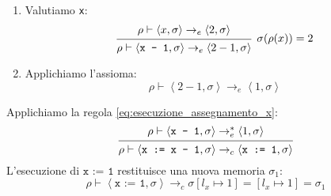 \documentclass[a4paper]{article}
\begin{document}
\begin{example}
\begin{itemize}
\begin{enumerate}
          \begin{enumerate}
            \item Valutiamo \texttt{x}:
              \[
                \begin{prooftree}
                  \hypo{ 
                    \rho \vdash \left< x, \sigma  \right> \to_e \left< 2, \sigma  \right>
                  }
                  \infer1[\( 
                    \sigma(\rho(x)) = 2
                  \)]{ 
                    \rho \vdash \left< \texttt{x - 1}, \sigma  \right> \to_e
                    \left< 2 - 1, \sigma  \right>
                  }
                \end{prooftree}
              \] 
            \item Applichiamo l'assioma:
              \[
                \rho \vdash \left< 2 - 1, \sigma  \right> \to_e
                \left< 1, \sigma  \right>
              \] 
          \end{enumerate}
          Applichiamo la regola \ref{eq:esecuzione_assegnamento_x}:
          \[
            \begin{prooftree}
              \hypo{ 
                \rho \vdash \left< \texttt{x - 1}, \sigma  \right> \to^*_e
                \left< 1, \sigma  \right>
              }
              \infer1{ 
                \rho \vdash \left< \texttt{x := x - 1}, \sigma  \right> \to_c
                \left< \texttt{x := 1}, \sigma  \right>
              }
            \end{prooftree}
          \] 
            L'esecuzione di \( \texttt{x := 1} \) restituisce una nuova memoria
            \( \sigma_1 \):
            \[
              \rho \vdash \left< \texttt{x := 1}, \sigma  \right> \to_c
              \sigma[l_x \mapsto 1] = \left[ l_x \mapsto 1 \right] = \sigma_1
            \] 


\end{enumerate}
\end{itemize}
\end{example}
\end{document}
